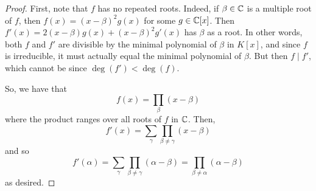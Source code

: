 \begin{proof}
    First, note that $f$ has no repeated roots. Indeed, if $\beta \in \mathbb{C}$ is a multiple root of $f$, then $f(x) = (x-\beta)^2g(x)$ for some $g \in \mathbb{C}[x]$. Then $f'(x) = 2(x-\beta)g(x)+(x-\beta)^2g'(x)$ has $\beta$ as a root. In other words, both $f$ and $f'$ are divisible by the minimal polynomial of $\beta$ in $K[x]$, and since $f$ is irreducible, it must actually equal the minimal polynomial of $\beta$. But then $f \mid f'$, which cannot be since $\deg(f') < \deg(f)$.

    So, we have that
    \[ f(x) = \prod_\beta (x-\beta) \]
    where the product ranges over all roots of $f$ in $\mathbb{C}$. Then,
    \[ f'(x) = \sum_\gamma \prod_{\beta \neq \gamma} (x-\beta) \]
    and so
    \[ f'(\alpha) = \sum_\gamma \prod_{\beta \neq \gamma} (\alpha-\beta) = \prod_{\beta \neq \alpha} (\alpha-\beta) \]
    as desired.
\end{proof}
